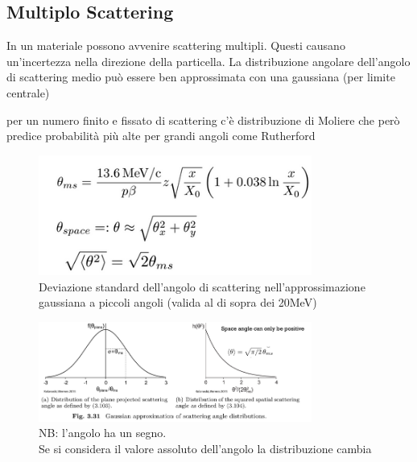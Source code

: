 \subsection*{Multiplo Scattering}
In un materiale possono avvenire scattering multipli. Questi causano un'incertezza nella direzione della particella.
La distribuzione angolare dell'angolo di scattering medio può essere ben approssimata  con una gaussiana (per limite centrale)
\begin{remark}
    per un numero finito e fissato di scattering c'è distribuzione di Moliere che però predice probabilità più alte per grandi angoli come Rutherford
\end{remark}
\begin{figure}[H]
    \centering
    \includegraphics[width=0.8\textwidth,frame]{Chapters/images/Interazione_radiazione_materia/image-20220217025524958.png}
    \captionsetup{width=0.8\linewidth}
    \caption{Deviazione standard dell'angolo di scattering nell'approssimazione gaussiana a piccoli angoli (valida al di sopra dei 20MeV)}
    \label{multiplescattering}
\end{figure}
\begin{figure}[H]
    \centering
    \includegraphics[width=0.8\textwidth,frame]{Chapters/images/Interazione_radiazione_materia/image-20220217030024845.png}
    \captionsetup{width=0.8\linewidth}
    \caption{NB: l'angolo ha un segno.\\Se si considera il valore assoluto dell'angolo la distribuzione cambia}
    \label{fig:mmscatteringradius}
\end{figure}
